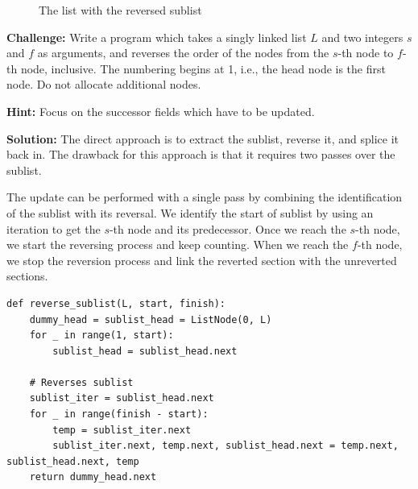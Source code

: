 \documentclass[11pt,a4paper]{article}
\begin{document}
\begin{figure}[hb]
  \centering
  \caption{The list with the reversed sublist}
  \label{fig:reversesublist2}
\end{figure}

\textbf{Challenge:} Write a program which takes a singly linked list $L$ and
two integers $s$ and $f$ as arguments, and reverses the order of the nodes
from the $s$-th node to $f$-th node, inclusive. The numbering begins at 1,
i.e., the head node is the first node. Do not allocate additional nodes.

\textbf{Hint:} Focus on the successor fields which have to be updated.

\textbf{Solution:} The direct approach is to extract the sublist, reverse it,
and splice it back in. The drawback for this approach is that it requires two
passes over the sublist.

The update can be performed with a single pass by combining the identification
of the sublist with its reversal. We identify the start of sublist by using an
iteration to get the $s$-th node and its predecessor. Once we reach the $s$-th
node, we start the reversing process and keep counting. When we reach the 
$f$-th node, we stop the reversion process and link the reverted section with
the unreverted sections.

\begin{verbatim}
def reverse_sublist(L, start, finish): 
    dummy_head = sublist_head = ListNode(0, L) 
    for _ in range(1, start):
        sublist_head = sublist_head.next

    # Reverses sublist
    sublist_iter = sublist_head.next 
    for _ in range(finish - start):
        temp = sublist_iter.next
        sublist_iter.next, temp.next, sublist_head.next = temp.next, sublist_head.next, temp
    return dummy_head.next  
\end{verbatim}  
\end{document}
